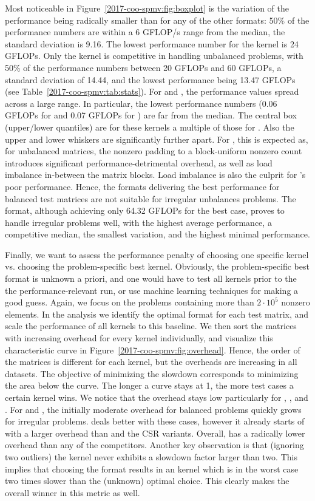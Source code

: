 Most noticeable in Figure~\ref{2017-coo-spmv:fig:boxplot} 
is the variation of the \coo performance being radically smaller than
for any of the other formats: 
50\% of the performance numbers are within a 6 GFLOP/s range from the median,
the standard deviation is 9.16. 
The lowest performance number for the \coo kernel is 24 GFLOPs.
Only the \csri kernel is competitive in handling unbalanced problems,
with 50\% of the performance numbers between 20 GFLOPs and 60 GFLOPs,
a standard deviation of 14.44, and the lowest performance being 13.47 GFLOPs 
(see Table~\ref{2017-coo-spmv:tab:stats}).
For \sellp and \csr, the performance values spread across a large range.
In particular, 
the lowest performance numbers (0.06 GFLOPs for \sellp and 0.07 GFLOPs for \csr) 
are far from the median. 
The central box (upper/lower quantiles)
are for these kernels a multiple of those for \coo. 
Also the upper and lower whiskers are significantly further apart.
For \sellp, this is expected as, for unbalanced matrices, the nonzero padding to a
block-uniform nonzero count introduces significant performance-detrimental
overhead, as well as load imbalance in-between the matrix blocks.
Load imbalance is also the culprit for \csr's poor performance.
Hence, the formats delivering the best performance for balanced test matrices
are not suitable for irregular unbalances problems.
The \coo format, although achieving only 64.32 GFLOPs for the best case,
proves to handle irregular problems well, with the highest average performance,
a competitive median, the smallest
variation, and the highest minimal performance.

Finally, we want to assess the performance penalty of choosing one specific kernel
vs. choosing the problem-specific best kernel.
Obviously, the problem-specific best format is unknown a priori, and one would have 
to test all kernels prior to the the performance-relevant run, or use machine learning techniques
for making a good guess. 
Again, we focus on the problems containing more than $2\cdot 10^5$ nonzero elements.
In the analysis we identify the optimal format for each test matrix,
and scale the performance of all kernels to this baseline.
We then sort the matrices with increasing overhead for every kernel
individually, and visualize this characteristic curve in
Figure~\ref{2017-coo-spmv:fig:overhead}. 
Hence, the order of the matrices is different for each kernel,
but the overheads are increasing in all datasets.
The objective of minimizing the slowdown corresponds to minimizing the area
below the curve. The longer a curve stays at 1, the more test cases a certain
kernel wins.
We notice that the overhead stays low particularly for \coo, \csri, and \csrfive.
For \sellp and \csr, the initially moderate overhead for balanced problems 
quickly grows for irregular problems.
\hyb deals better with these cases, however it already starts of with a larger overhead than 
\coo and the CSR variants.
Overall, \coo has a radically lower overhead than any of the competitors.
Another key observation is that (ignoring two outliers) the \coo kernel never
exhibits a slowdown factor larger than two. This implies that choosing the \coo
format results in an \spmv kernel which is in the worst case two times slower
than the (unknown) optimal choice. 
This clearly makes \coo the overall winner in this metric as well.
